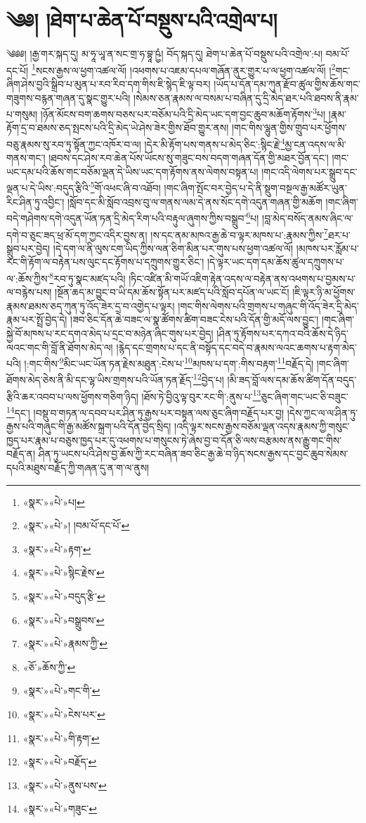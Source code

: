 \chapter{༄༅། །ཐེག་པ་ཆེན་པོ་བསྡུས་པའི་འགྲེལ་པ།}༄༅༅། །རྒྱ་གར་སྐད་དུ། མ་ཧཱ་ཡཱ་ན་སང་གྲ་ཧ་བྷཱ་ཥྱཾ། བོད་སྐད་དུ། ཐེག་པ་ཆེན་པོ་བསྡུས་པའི་འགྲེལ་:པ། བམ་པོ་དང་པོ། \footnote{«སྣར་»«པེ་»པ།  }སངས་རྒྱས་ལ་ཕྱག་འཚལ་ལོ། །འཕགས་པ་འཇམ་དཔལ་གཞོན་ནུར་གྱུར་པ་ལ་ཕྱག་འཚལ་ལོ། །\footnote{«སྣར་»«པེ་»། །བམ་པོ་དང་པོ་}གང་ཞིག་ཤེས་བྱའི་སྒྲིབ་པ་མུན་པ་རབ་རིབ་དག་གིས་ཇི་སྙེད་ཇི་ལྟ་བར། །ཡོད་པ་དོན་དམ་ཀུན་རྫོབ་ཚུལ་གྱིས་ཆོས་གང་གཟུགས་བརྙན་གཞན་དུ་སྣང་གྱུར་པའི། །སེམས་ཅན་རྣམས་ལ་བསམ་པ་བཞིན་དུ་དྲི་མེད་ཐར་པའི་ཐབས་ནི་རྣམ་པ་གསུམ། །ཉོན་མོངས་བག་ཆགས་བཅས་པར་བཅོམ་པའི་དྲི་མེད་ཡང་དག་བྱང་ཆུབ་མཆོག་རྟོགས་\footnote{«སྣར་»«པེ་»རྟག་}པ། །རྣམ་རྟོག་དྲ་བ་ཐམས་ཅད་སྤངས་པའི་དྲི་མེད་ཡེ་ཤེས་ཟེར་གྱིས་ཐོབ་གྱུར་ནས། །གང་གིས་ལྷུན་གྱིས་གྲུབ་པར་ཕྱོགས་བཅུ་རྣམས་སུ་རབ་ཏུ་སྟོན་ཀྱང་འཁོར་བ་ལ། །དེར་མི་རྟོག་པས་གནས་པ་མེད་ཅིང་:སྙིང་རྗེ་\footnote{«སྣར་»«པེ་»སྙིང་རྗེས་}མྱ་ངན་འདས་ལ་མི་གནས་གང་། །ཐབས་དང་ཤེས་རབ་ཆེན་པོས་ཡོངས་སུ་གཟུང་བས་བདག་གཞན་དོན་གྱི་མཐར་བྱོན་དང་། །གང་ཡང་དམ་པའི་ཆོས་གང་བཅོམ་ལྡན་དེ་ཡིས་ཡང་དག་རྟོགས་ནས་ལེགས་བསྟན་པ། །གང་འདི་ལེགས་པར་སྒྲུབ་དང་ལྡན་པ་དེ་ཡིས་:བདུད་རྩིའི་\footnote{«སྣར་»«པེ་»བདུད་རྩི་}གོ་འཕང་ཞི་བ་འཐོབ། །གང་ཞིག་སྤོང་བར་བྱེད་པ་དེ་ནི་སྡུག་བསྔལ་རྒྱ་མཚོར་ཡུན་རིང་ཤིན་ཏུ་འབྱིང་། །སློབ་དང་མི་སློབ་འབྲས་བུ་ལ་གནས་ལམ་དེ་ནས་སོང་དགེ་འདུན་གཞན་གྱི་མཆོག །གང་ཞིག་བདེ་གཤེགས་དགེ་འདུན་ཡོན་ཏན་དྲི་མེད་རིག་པའི་བརྟུལ་ཞུགས་ཀྱིས་བསྒྲུབ་\footnote{«སྣར་»«པེ་»བསྒྲུབས་}པ། །བླ་མེད་བསོད་ནམས་ཞིང་ལ་དགེ་བ་ཅུང་ཟད་ཕྲ་མོ་དག་ཀྱང་འདིར་བྱས་ན། །ས་དང་ནམ་མཁའ་རྒྱ་ཆེ་བ་ལྟར་མཁས་པ་:རྣམས་ཀྱིས་\footnote{«སྣར་»«པེ་»རྣམས་ཀྱི་}ཐར་པ་སྒྲུབ་པར་བྱེད། །དེ་དག་ལ་ནི་ལུས་ངག་ཡིད་ཀྱིས་ལན་ཅིག་མིན་པར་གུས་པས་ཕྱག་འཚལ་ལོ། །མཁས་པར་རློམ་པ་རང་གི་རྟོག་ལ་བརྟེན་པས་ལུང་དང་རྟོགས་པ་དཀྲུགས་གྱུར་ཅིང་། །དེ་ལྟར་ཡང་དག་དམ་ཆོས་ཚུལ་དཀྲུགས་པ་ལ་:ཆོས་ཀྱིས་\footnote{«ཅོ་»ཆོས་ཀྱི་}རབ་ཏུ་སྣང་མཛད་པའི། །ཏིང་འཛིན་མི་གཡོ་འཇིག་རྟེན་འདས་ལ་བརྟེན་ནས་འཕགས་པ་བྱམས་པ་ལ་བརྙེས་པས། །སྔོན་ཆད་མ་བྱུང་བ་ཡི་དམ་ཆོས་སྟོན་པར་མཛད་པའི་སློབ་དཔོན་ལ་ཡང་ངོ། །ཇི་ལྟར་ཉི་མ་ཕྱོགས་རྣམས་ཐམས་ཅད་ཀུན་ཏུ་འོད་ཟེར་དྲ་བ་འགྱེད་པ་ལྟར། །གང་གིས་ལེགས་པའི་གྲགས་པ་གཞུང་གི་འོད་ཟེར་དྲི་མེད་རྣམ་པར་སྤྲོ་བྱེད་དེ། །ཟབ་ཅིང་དོན་ཆེ་བཟང་ལ་སྣ་ཚོགས་ཚིག་བཟང་ངེས་པའི་དོན་གྱི་མདོ་ལས་བྱུང་། །གང་ཞིག་སྐྱེ་བོ་མཁས་པ་རང་དགའ་མེད་པ་དྲང་བ་མཉེན་ཞིང་གུས་པར་བྱེད། །ཤིན་ཏུ་རྟོགས་པར་དཀའ་བའི་ཆོས་དེ་ཉིད་ལའང་གང་གི་བློ་ནི་ཐོགས་མེད་ལ། །རྙེད་དང་གྲགས་པ་དང་ནི་བསྟོད་དང་བདེ་བ་རྣམས་ལའང་ཆགས་པ་རྟག་མེད་པའི། །:གང་གིས་\footnote{«སྣར་»«པེ་»གང་གི་}མིང་ཡང་ཡོན་ཏན་རྗེས་མཐུན་:ངེས་པ་\footnote{«སྣར་»«པེ་»ངེས་པར་}མཁས་པ་དག་:གིས་བརྟག་\footnote{«སྣར་»«པེ་»གི་རྟག་}བརྗོད་དེ། །གང་ཞིག་ཐོགས་མེད་ཅེས་ནི་མི་དང་ལྷ་ཡིས་གྲགས་པའི་ཡོན་ཏན་རྗོད་\footnote{«སྣར་»«པེ་»བརྗོད་}བྱེད་པ། །མི་ཟད་བློ་ལས་དམ་ཆོས་ཚིག་དོན་བདུད་རྩིའི་ཆར་འབབ་པ་ལས་ཕྱོགས་གཅིག་ཉིད། །ཐོས་ཏེ་བྱིའུ་ལྟ་བུར་རང་གི་:ནུས་པ་\footnote{«སྣར་»«པེ་»ནུས་པས་}ཅུང་ཞིག་གང་ཡང་ཅི་བཟུང་\footnote{«སྣར་»«པེ་»གཟུང་}དང་། །བསྡུ་བ་གཏན་ལ་དབབ་པར་ཤིན་ཏུ་རྒྱས་པར་བསྟན་ལས་ཅུང་ཞིག་བརྗོད་པར་བྱ། །དེས་ཀྱང་ལ་ལ་ཤིན་ཏུ་རྒྱས་པའི་གཞུང་གི་རྒྱ་མཚོས་སྐྲག་པའི་དོན་བྱེད་སྲིད། །འདི་ལྟར་སངས་རྒྱས་བཅོམ་ལྡན་འདས་རྣམས་ཀྱི་གསུང་ཁྱད་པར་རྣམ་པ་བཅུས་ཁྱད་པར་དུ་འཕགས་པ་གསུངས་ཏེ་ཞེས་བྱ་བ་དོན་ཅི་ལས་བརྩམས་ནས་རྒྱུ་གང་གིས་བརྗོད་ན། ཤིན་ཏུ་ཡངས་པའི་ཤེས་བྱ་ཆོས་ཀྱི་རང་བཞིན་ཟབ་ཅིང་རྒྱ་ཆེ་བ་ཉིད་སངས་རྒྱས་དང་བྱང་ཆུབ་སེམས་དཔའི་མཐུས་བརྗོད་ཀྱི་གཞན་དུ་ན་ག་ལ་ནུས། 